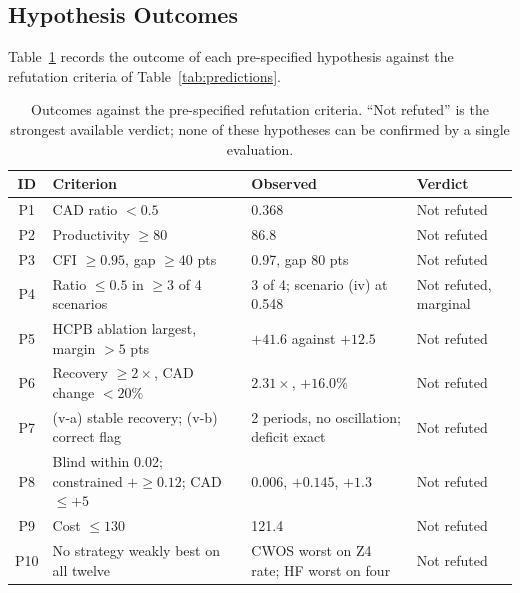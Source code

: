 	\FloatBarrier
	
	\subsection{Hypothesis Outcomes}
	\label{sec:hypoutcomes}
	
	Table~\ref{tab:hypoutcomes} records the outcome of each pre-specified hypothesis against the refutation criteria of Table~\ref{tab:predictions}.
	
	\begin{table}[!htbp]
		\caption{Outcomes against the pre-specified refutation criteria. ``Not refuted'' is the strongest available verdict; none of these hypotheses can be confirmed by a single evaluation.}
		\label{tab:hypoutcomes}
		\small
		\begin{tabularx}{\textwidth}{@{}cXlX@{}}
			\toprule
			\textbf{ID} & \textbf{Criterion} & \textbf{Observed} & \textbf{Verdict}\\
			\midrule
			P1 & CAD ratio $< 0.5$ & 0.368 & Not refuted\\
			P2 & Productivity $\geq 80$ & 86.8 & Not refuted\\
			P3 & CFI $\geq 0.95$, gap $\geq 40$ pts & 0.97, gap 80 pts & Not refuted\\
			P4 & Ratio $\leq 0.5$ in $\geq 3$ of 4 scenarios & 3 of 4; scenario (iv) at 0.548 & Not refuted, marginal\\
			P5 & HCPB ablation largest, margin $> 5$ pts & $+41.6$ against $+12.5$ & Not refuted\\
			P6 & Recovery $\geq 2\times$, CAD change $< 20\%$ & $2.31\times$, $+16.0\%$ & Not refuted\\
			P7 & (v-a) stable recovery; (v-b) correct flag & 2 periods, no oscillation; deficit exact & Not refuted\\
			P8 & Blind within 0.02; constrained $+\geq 0.12$; CAD $\leq +5$ & 0.006, $+0.145$, $+1.3$ & Not refuted\\
			P9 & Cost $\leq 130$ & 121.4 & Not refuted\\
			P10 & No strategy weakly best on all twelve & CWOS worst on Z4 rate; HF worst on four & Not refuted\\
			\bottomrule
		\end{tabularx}
	\end{table}
	
